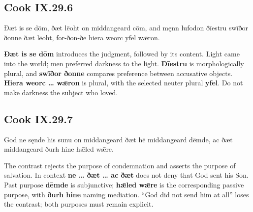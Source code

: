 \subsection*{Cook IX.29.6}

\par\begin{minipage}{\linewidth}\raggedright
Ðæt is se dōm, ðæt lēoht on middangeard cōm, and męnn lufodon ðīestru swīðor ðonne ðæt lēoht, for-ðon-ðe hiera weorc yfel wǣron.

\textbf{Ðæt is se dōm} introduces the judgment, followed by its content. Light came into the world; men preferred darkness to the light. \textbf{Ðīestru} is morphologically plural, and \textbf{swīðor ðonne} compares preference between accusative objects. \textbf{Hiera weorc … wǣron} is plural, with the selected neuter plural \textbf{yfel}. Do not make darkness the subject who loved.

\end{minipage}\par\addvspace{4pt}

\subsection*{Cook IX.29.7}

\par\begin{minipage}{\linewidth}\raggedright
God ne sęnde his sunu on middangeard ðæt hē middangeard dēmde, ac ðæt middangeard ðurh hine hǣled wǣre.

The contrast rejects the purpose of condemnation and asserts the purpose of salvation. In context \textbf{ne … ðæt … ac ðæt} does not deny that God sent his Son. Past purpose \textbf{dēmde} is subjunctive; \textbf{hǣled wǣre} is the corresponding passive purpose, with \textbf{ðurh hine} naming mediation. “God did not send him at all” loses the contrast; both purposes must remain explicit.

\end{minipage}\par\addvspace{4pt}

